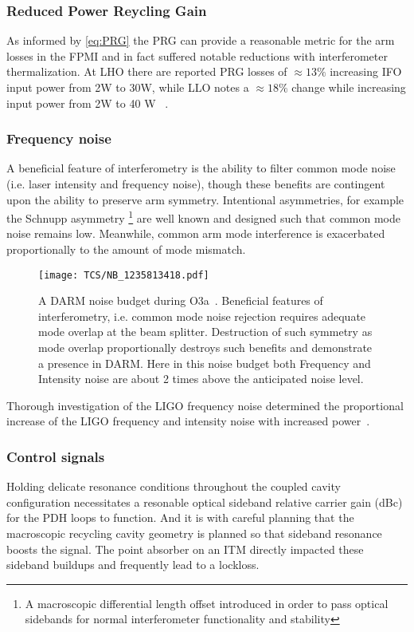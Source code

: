 \subsubsection{Reduced Power Reycling Gain}
As informed by \autoref{eq:PRG} the PRG can provide a reasonable metric for the arm losses in the FPMI and in fact suffered notable reductions with interferometer thermalization. At LHO there are reported PRG losses of $\approx 13\%$ increasing IFO input power from 2W to 30W, while LLO notes a $\approx 18\%$ change while increasing input power from 2W to 40 W ~\cite{elog:2019_01_21:cahillane}.

\subsubsection{Frequency noise}
A beneficial feature of interferometry is the ability to filter common mode noise (i.e. laser intensity and frequency noise), though these benefits are contingent upon the ability to preserve arm symmetry. Intentional asymmetries, for example the Schnupp asymmetry \footnote{A macroscopic differential length offset introduced in order to pass optical sidebands for normal interferometer functionality and stability} are well known and designed such that common mode noise remains low. Meanwhile, common arm mode interference is exacerbated proportionally to the amount of mode mismatch.

\begin{figure}[H]
    \texttt{[image: TCS/NB\_1235813418.pdf]}
    \caption{A DARM noise budget during O3a~\cite{elog:2018:dwyer}. Beneficial features of interferometry, i.e. common mode noise rejection requires adequate mode overlap at the beam splitter. Destruction of such symmetry as mode overlap proportionally destroys such benefits and demonstrate a presence in DARM. Here in this noise budget both Frequency and Intensity noise are about 2 times above the anticipated noise level.}  
    \label{fig:high_freqnoise}
\end{figure}

Thorough investigation of the LIGO frequency noise determined the proportional increase of the LIGO frequency and intensity noise with increased power~\cite{buikema:2020}.

\subsubsection{Control signals}
Holding delicate resonance conditions throughout the coupled cavity configuration necessitates a resonable optical sideband relative carrier gain (dBc) for the PDH loops to function. And it is with careful planning that the macroscopic recycling cavity geometry is planned so that sideband resonance boosts the signal. The point absorber on an ITM directly impacted these sideband buildups and frequently lead to a lockloss. 

